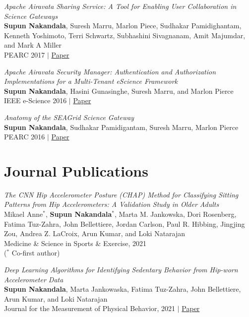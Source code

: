 \documentclass[margin]{res}
\begin{document}
\begin{resume}
\par
\textit{Apache Airavata Sharing Service: A Tool for Enabling User Collaboration in Science Gateways} \\
\textbf{Supun Nakandala}, Suresh Marru, Marlon Piece, Sudhakar Pamidighantam, Kenneth Yoshimoto, Terri Schwartz, Subhashini Sivagnanam, Amit Majumdar, and Mark A Miller\\
PEARC 2017 $|$ \href{https://dl.acm.org/doi/10.1145/3093338.3093359}{Paper}

\par
\textit{Apache Airavata Security Manager: Authentication and Authorization Implementations for a Multi-Tenant eScience Framework} \\
\textbf{Supun Nakandala}, Hasini Gunasinghe, Suresh Marru, and Marlon Pierce\\
IEEE e-Science 2016 $|$ \href{https://scholarworks.iu.edu/dspace/bitstream/handle/2022/21092/airavata-security-escience16.pdf;jsessionid=58FF59D4EDF8DA7C45FB89F78B187A3C?sequence=1}{Paper}

\par
\textit{Anatomy of the SEAGrid Science Gateway} \\
\textbf{Supun Nakandala}, Sudhakar Pamidigantam, Suresh Marru, Marlon Pierce\\
PEARC 2016 $|$ \href{https://dl.acm.org/doi/pdf/10.1145/2949550.2949591}{Paper}


\section{Journal Publications}
\par
\textit{The CNN Hip Accelerometer Posture (CHAP) Method for Classifying Sitting Patterns from Hip Accelerometers: A Validation Study in Older Adults} \\
Mikael Anne$^*$, \textbf{Supun Nakandala}$^*$, Marta M. Jankowska, Dori Rosenberg, Fatima Tuz-Zahra, John Bellettiere, Jordan Carlson, Paul R. Hibbing, Jingjing Zou, Andrea Z. LaCroix, Arun Kumar, and Loki Natarajan\\
Medicine \& Science in Sports \& Exercise, 2021\\
($^*$ Co-first author)

\par
\textit{Deep Learning Algorithms for Identifying Sedentary Behavior from Hip-worn Accelerometer Data} \\
\textbf{Supun Nakandala}, Marta Jankowaska, Fatima Tuz-Zahra, John Bellettiere, Arun Kumar, and Loki Natarajan\\
Journal for the Measurement of Physical Behavior, 2021 $|$ \href{https://adalabucsd.github.io/papers/2021_JMPB_CNN.pdf}{Paper}


\end{resume}
\end{document}
